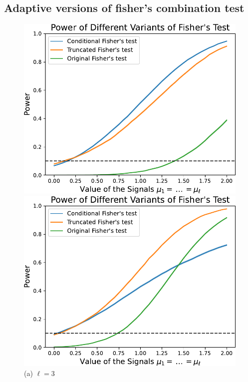 \documentclass{article}
\begin{document}
\subsection{Adaptive versions of fisher's combination test}

\begin{figure}
    \centering
    \hspace{-0.035\textwidth}
    \begin{minipage}{0.32\textwidth}
        \centering
        \includegraphics[width=\textwidth]{fig/fisher_ell=3.pdf}
        \caption*{(a) $\ell=3$}
    \end{minipage}
    \hfill
    \hspace{0.01\textwidth}
    \begin{minipage}{0.32\textwidth}
        \centering
        \includegraphics[width=\textwidth]{fig/fisher_ell=5.pdf}

\end{minipage}
\end{figure}
\end{document}
